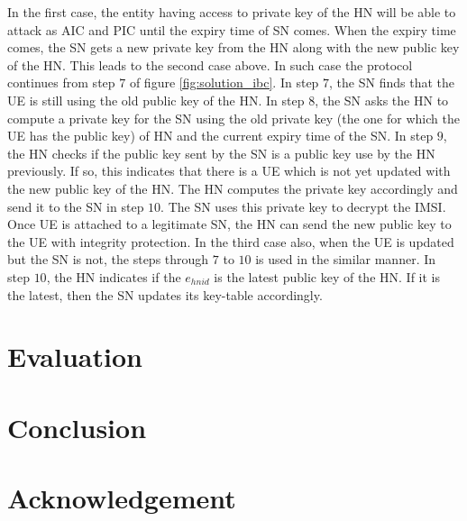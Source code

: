 \documentclass[lnicst,sechang,a4paper]{svmultln}
\begin{document}
In the first case, the entity having access to private key of the HN will be able to attack as AIC and PIC until the expiry time of SN comes. When the expiry time comes, the SN gets a new private key from the HN along with the new public key of the HN. This leads to the second case above. In such case the protocol continues from step $7$ of figure \ref{fig:solution_ibc}. In step $7$, the SN finds that the UE is still using the old public key of the HN. In step $8$, the SN asks the HN to compute a private key for the SN using the old private key (the one for which the UE has the public key) of HN and the current expiry time of the SN. In step $9$, the HN checks if the public key sent by the SN is a public key use by the HN previously. If so, this indicates that there is a UE which is not yet updated with the new public key of the HN. The HN computes the private key accordingly and send it to the SN in step $10$. The SN uses this private key to decrypt the IMSI. Once UE is attached to a legitimate SN, the HN can send the new public key to the UE with integrity protection. In the third case also, when the UE is updated but the SN is not, the steps through $7$ to $10$ is used in the similar manner. In step $10$, the HN indicates if the $e_{hnid}$ is the latest public key of the HN. If it is the latest, then the SN updates its key-table accordingly.


\section{Evaluation}
\label{sec:evaluation}

\section{Conclusion}
\label{sec:conclusion}

\section{Acknowledgement}
\label{sec:acknowledgement}
\end{document}
